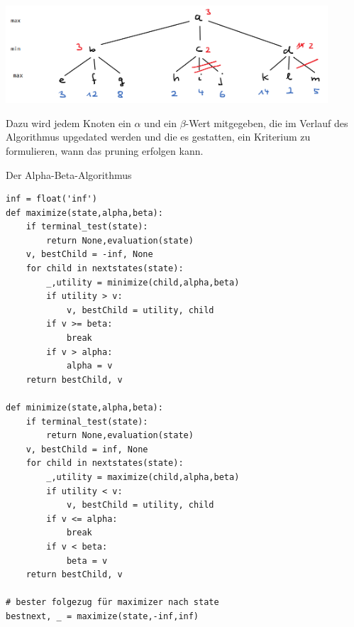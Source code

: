 \documentclass{beamer}
\begin{document}
\begin{frame}[fragile]
\includegraphics[width=12cm]{bild13.png}   

Dazu wird jedem Knoten ein $\alpha$  und ein $\beta$-Wert mitgegeben, die im Verlauf des Algorithmus upgedated
werden und die es gestatten, ein Kriterium zu formulieren, wann das pruning erfolgen kann.
\end{frame}


\begin{frame}[fragile]
Der Alpha-Beta-Algorithmus \\
\begin{minipage}[t]{7.5cm}
\begin{lstlisting}[basicstyle=\tiny]
inf = float('inf')
def maximize(state,alpha,beta):
    if terminal_test(state):
        return None,evaluation(state)
    v, bestChild = -inf, None
    for child in nextstates(state):
        _,utility = minimize(child,alpha,beta)
        if utility > v:
            v, bestChild = utility, child
        if v >= beta:
            break
        if v > alpha:
            alpha = v
    return bestChild, v

def minimize(state,alpha,beta):
    if terminal_test(state):
        return None,evaluation(state)
    v, bestChild = inf, None
    for child in nextstates(state):
        _,utility = maximize(child,alpha,beta)
        if utility < v:
            v, bestChild = utility, child
        if v <= alpha:
            break
        if v < beta:
            beta = v
    return bestChild, v 

# bester folgezug für maximizer nach state
bestnext, _ = maximize(state,-inf,inf)
\end{lstlisting}  
\end{minipage} 
\end{frame}
\end{document}
